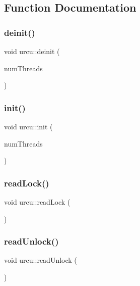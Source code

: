 \subsection{Function Documentation}
\mbox{\label{namespaceurcu_a4c5c060c1f3a160b1eeb3be3c3f98695}} 
\subsubsection{\texorpdfstring{deinit()}{deinit()}}
{\footnotesize\ttfamily void urcu\+::deinit (\begin{DoxyParamCaption}\item[{const int}]{num\+Threads }\end{DoxyParamCaption})}

\mbox{\label{namespaceurcu_ae71ce69710f4a5bcb4bfc31df8ee85b8}} 
\subsubsection{\texorpdfstring{init()}{init()}}
{\footnotesize\ttfamily void urcu\+::init (\begin{DoxyParamCaption}\item[{const int}]{num\+Threads }\end{DoxyParamCaption})}

\mbox{\label{namespaceurcu_ac3f9e7761be4b1daf2603bc8c8a4c205}} 
\subsubsection{\texorpdfstring{read\+Lock()}{readLock()}}
{\footnotesize\ttfamily void urcu\+::read\+Lock (\begin{DoxyParamCaption}{ }\end{DoxyParamCaption})}

\mbox{\label{namespaceurcu_a1d3b27b2ee4acc50da4a0577f18b6ab9}} 
\subsubsection{\texorpdfstring{read\+Unlock()}{readUnlock()}}
{\footnotesize\ttfamily void urcu\+::read\+Unlock (\begin{DoxyParamCaption}{ }\end{DoxyParamCaption})}

